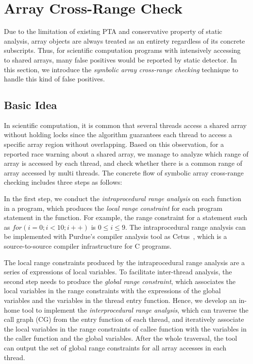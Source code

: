 \documentclass[10pt,onecolumn,letterpaper]{article}
\begin{document}
\section{Array Cross-Range Check}
Due to the limitation of existing PTA and conservative property of
static analysis, array objects are always treated as an entirety
regardless of its concrete subscripts. Thus, for scientific
computation programs with intensively accessing to shared arrays,
many false positives would be reported by static detector. In this
section, we introduce the \emph{symbolic array cross-range checking}
technique to handle this kind of false positives.

\subsection{Basic Idea}
In scientific computation, it is common that several threads access
a shared array without holding locks since the algorithm guarantees
each thread to access a specific array region without overlapping.
Based on this observation, for a reported race warning about a
shared array, we manage to analyze which range of array is accessed
by each thread, and check whether there is a common range of array
accessed by multi threads. The concrete flow of symbolic array
cross-range checking includes three steps as follows:

In the first step, we conduct the \emph{intraprocedural range
analysis} on each function in a program, which produces the
\emph{local range constraint} for each program statement in the
function. For example, the range constraint for a statement such as
$for(i = 0; i < 10; i++)$ is $0 \le i \le 9$. The intraprocedural
range analysis can be implemented with Purdue's compiler analysis
tool as Cetus~\cite{Dave09Computer}, which is a source-to-source
compiler infrastructure for C programs.

The local range constraints produced by the intraprocedural range
analysis are a series of expressions of local variables. To
facilitate inter-thread analysis, the second step needs to produce
the \emph{global range constraint}, which associates the local
variables in the range constraints with the expressions of the
global variables and the variables in the thread entry function.
Hence, we develop an in-home tool to implement the
\emph{interprocedural range analysis}, which can traverse the call
graph (CG) from the entry function of each thread, and iteratively
associate the local variables in the range constraints of callee
function with the variables in the caller function and the global
variables. After the whole traversal, the tool can output the set of
global range constraints for all array accesses in each thread.
\end{document}
